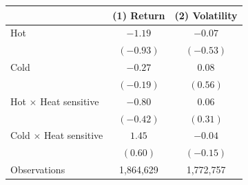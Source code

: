 \begin{tabular}{@{}lcc@{}}
\toprule
 & (1) Return & (2) Volatility \\
\midrule
Hot & $-1.19$ & $-0.07$ \\
 & $(-0.93)$ & $(-0.53)$ \\
Cold & $-0.27$ & $0.08$ \\
 & $(-0.19)$ & $(0.56)$ \\
Hot $\times$ Heat sensitive & $-0.80$ & $0.06$ \\
 & $(-0.42)$ & $(0.31)$ \\
Cold $\times$ Heat sensitive & $1.45$ & $-0.04$ \\
 & $(0.60)$ & $(-0.15)$ \\
\midrule
Observations & 1,864,629 & 1,772,757 \\
\bottomrule
\end{tabular}

